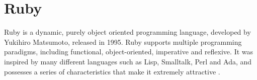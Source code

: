 
\section{Ruby}\label{sec:technologies:ruby}

Ruby is a dynamic, purely object oriented programming language, developed by Yukihiro Matsumoto, released in 1995. Ruby supports multiple programming paradigms, including functional, object-oriented, imperative and reflexive. It was inspired by many different languages such as Lisp, Smalltalk, Perl and Ada, and possesses a series of characteristics that make it extremely attractive \cite{ruby}.



